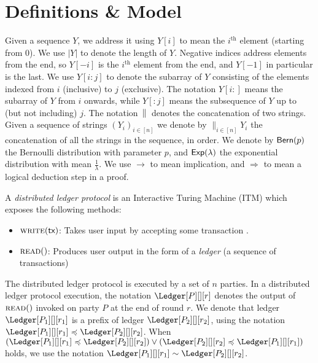 \section{Definitions \& Model}\label{sec:model}

\noindent
\myparagraph[Notation]
Given a sequence $Y$, we address it using $Y[i]$ to mean the $i^\text{th}$ element (starting from $0$).
We use $|Y|$ to denote the length of $Y$.
Negative indices address elements from the end, so $Y[-i]$ is the $i^\text{th}$ element from
the end, and $Y[-1]$ in particular is the last. We use $Y[i{:}j]$ to denote the subarray of $Y$
consisting of the elements indexed from $i$ (inclusive) to $j$ (exclusive). The notation $Y[i{:}]$ means the
subarray of $Y$ from $i$ onwards, while $Y[{:}j]$ means the subsequence of $Y$ up to (but not including) $j$.
The notation $\,\|\,$ denotes the concatenation of two strings.
Given a sequence of strings $(Y_i)_{i \in [n]}$ we denote by $\big\lVert_{i \in [n]} Y_i$ the concatenation
of all the strings in the sequence, in order. We denote by $\textsf{Bern}(p)$ the Bernoulli distribution with parameter $p$,
and $\textsf{Exp}(\lambda)$ the exponential distribution with mean $\frac{1}{\lambda}$.
We use $\rightarrow$ to mean implication, and $\Rightarrow$ to mean a logical
deduction step in a proof.

\begin{definition}
  A \emph{distributed ledger protocol} is an Interactive Turing Machine (ITM)
  which exposes the following methods:

  \begin{itemize}
    \item $\textsc{write}(\textsf{tx})$:
      Takes user input by accepting some transaction \tx.
    \item $\textsc{read}()$:
      Produces user output in the form of a \emph{ledger} (a sequence of transactions)
  \end{itemize}
\end{definition}

The distributed ledger protocol is executed by a set of $n$ parties.
In a distributed ledger protocol execution, the notation
$\Ledger[P][][r]$ denotes the output of $\textsc{read}()$
invoked on party $P$ at the end of round $r$.
We denote that ledger
$\Ledger[P_1][][r_1]$ is a prefix of ledger $\Ledger[P_2][][r_2]$,
using the notation
$\Ledger[P_1][][r_1] \preccurlyeq \Ledger[P_2][][r_2]$. When
$(\Ledger[P_1][][r_1] \preccurlyeq \Ledger[P_2][][r_2]) \lor (\Ledger[P_2][][r_2] \preccurlyeq \Ledger[P_1][][r_1])$ holds,
we use the notation $\Ledger[P_1][][r_1] \sim \Ledger[P_2][][r_2]$.

